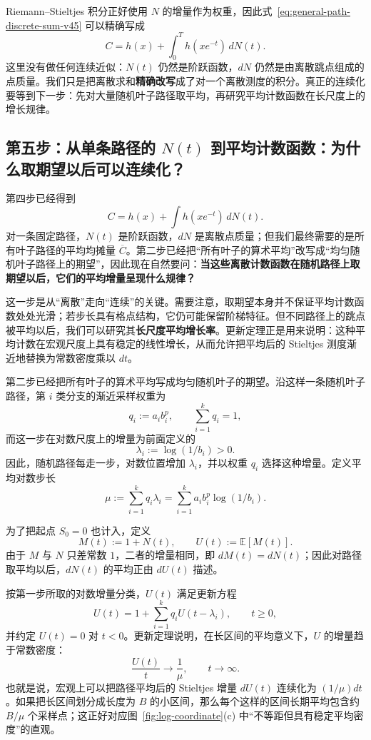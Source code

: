 \documentclass[11pt,a4paper]{article}
\begin{document}
Riemann--Stieltjes 积分正好使用 $N$ 的增量作为权重，因此式~\eqref{eq:general-path-discrete-sum-v45} 可以精确写成
\begin{equation}
C=h(x)+\int_{0}^{T} h(xe^{-t})\,dN(t).
\label{eq:path-stieltjes-v36}
\end{equation}
这里没有做任何连续近似：$N(t)$ 仍然是阶跃函数，$dN$ 仍然是由离散跳点组成的点质量。我们只是把离散求和\textbf{精确改写}成了对一个离散测度的积分。真正的连续化要等到下一步：先对大量随机叶子路径取平均，再研究平均计数函数在长尺度上的增长规律。

\subsection{第五步：从单条路径的 $N(t)$ 到平均计数函数：为什么取期望以后可以连续化？}
第四步已经得到
\[
C=h(x)+\int h(xe^{-t})\,dN(t).
\]
对一条固定路径，$N(t)$ 是阶跃函数，$dN$ 是离散点质量；但我们最终需要的是所有叶子路径的平均均摊量 $\overline C$。第二步已经把“所有叶子的算术平均”改写成“均匀随机叶子路径上的期望”，因此现在自然要问：\textbf{当这些离散计数函数在随机路径上取期望以后，它们的平均增量呈现什么规律？}

这一步是从“离散”走向“连续”的关键。需要注意，取期望本身并不保证平均计数函数处处光滑；若步长具有格点结构，它仍可能保留阶梯特征。但不同路径上的跳点被平均以后，我们可以研究其\textbf{长尺度平均增长率}。更新定理正是用来说明：这种平均计数在宏观尺度上具有稳定的线性增长，从而允许把平均后的 Stieltjes 测度渐近地替换为常数密度乘以 $dt$。

第二步已经把所有叶子的算术平均写成均匀随机叶子的期望。沿这样一条随机叶子路径，第 $i$ 类分支的渐近采样权重为
\[
q_i:=a_i b_i^p,
\qquad \sum_{i=1}^k q_i=1,
\]
而这一步在对数尺度上的增量为前面定义的
\[
\lambda_i:=\log(1/b_i)>0.
\]
因此，随机路径每走一步，对数位置增加 $\lambda_i$，并以权重 $q_i$ 选择这种增量。定义平均对数步长
\begin{equation}
\mu
:=\sum_{i=1}^k q_i\lambda_i
=\sum_{i=1}^k a_i b_i^p\log(1/b_i).
\label{eq:mean-log-step-v47}
\end{equation}

为了把起点 $S_0=0$ 也计入，定义
\begin{equation}
M(t):=1+N(t),
\qquad
U(t):=\mathbb E[M(t)].
\label{eq:renewal-U-v47}
\end{equation}
由于 $M$ 与 $N$ 只差常数 $1$，二者的增量相同，即 $dM(t)=dN(t)$；因此对路径取平均以后，$dN(t)$ 的平均正由 $dU(t)$ 描述。

按第一步所取的对数增量分类，$U(t)$ 满足更新方程
\begin{equation}
U(t)=1+\sum_{i=1}^k q_iU(t-\lambda_i),
\qquad t\ge0,
\label{eq:renewal-equation-v47}
\end{equation}
并约定 $U(t)=0$ 对 $t<0$。更新定理说明，在长区间的平均意义下，$U$ 的增量趋于常数密度：
\begin{equation}
\frac{U(t)}{t}\longrightarrow\frac1\mu,
\qquad t\to\infty.
\label{eq:renewal-density-v47}
\end{equation}
也就是说，宏观上可以把路径平均后的 Stieltjes 增量 $dU(t)$ 连续化为 $(1/\mu)dt$。如果把长区间划分成长度为 $B$ 的小区间，那么每个这样的区间长期平均包含约 $B/\mu$ 个采样点；这正好对应图~\ref{fig:log-coordinate}(c) 中“不等距但具有稳定平均密度”的直观。
\end{document}
